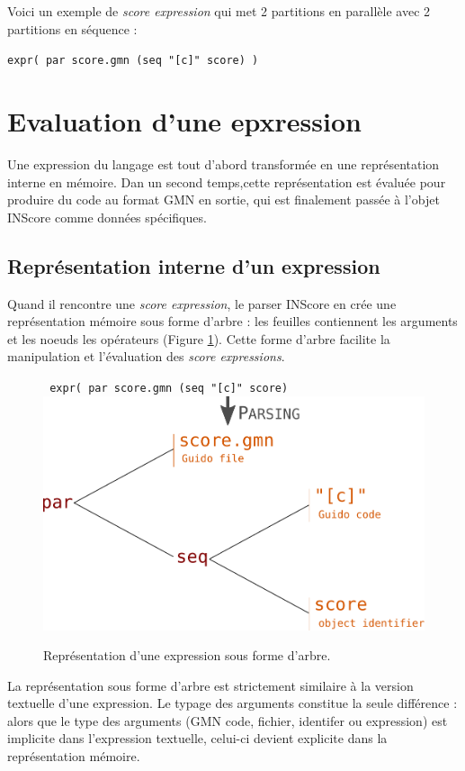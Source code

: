\documentclass{article}
\newcommand{\OSC}[1]{\texttt{#1}}
\newcommand{\oper}[1]{\textcolor{figRed}{#1}}
\newcommand{\param}[1]{\textcolor{figOrange}{#1}}
\newcommand{\sExpr}{\emph{score expression}}
\newcommand{\sExprs}{\emph{score expressions}}
\newcommand{\sample}	[1]			{\vspace{-0.2em}\begin{center}\colorbox{mygrey}{\begin{minipage}[t]{0.97\columnwidth} {\small \texttt{#1}}\end{minipage}}\end{center}}
\begin{document}
Voici un exemple de \emph{score expression} qui met 2 partitions en parallèle avec 2 partitions en séquence :
\sample{expr( par score.gmn (seq "[c]" score) )}

\section{Evaluation d'une epxression}
\label{evaluationSpec}
Une expression du langage est tout d'abord transformée en une représentation interne en mémoire. Dan un second temps,cette représentation est évaluée pour produire du code au format GMN en sortie, qui est finalement passée à l'objet INScore comme données spécifiques.

\subsection{Représentation interne d'un expression}

Quand il rencontre une  \sExpr, le parser INScore en crée une représentation mémoire sous forme d'arbre : les feuilles contiennent les arguments et les noeuds les opérateurs (Figure \ref{fig:parsing}). Cette forme d'arbre facilite la manipulation et l'évaluation des \sExprs.

\begin{figure}[th]
\centering
\OSC{ expr( \oper{par} \param{score.gmn}  (\oper{seq} \param{"[c]" score})}
\includegraphics[width=0.8\columnwidth]{imgs/exprParse}
\caption{Représentation d'une expression sous forme d'arbre.
\label{fig:parsing}}
\end{figure}

La représentation sous forme d'arbre est strictement similaire à la version textuelle d'une expression. Le typage des arguments constitue la seule différence : alors que le type des arguments (GMN code, fichier, identifer ou expression) est implicite dans l'expression textuelle, celui-ci devient explicite dans la représentation mémoire. 
\end{document}
